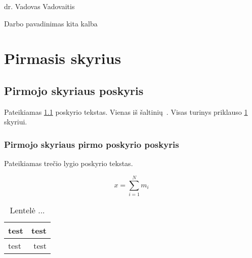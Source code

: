 \documentclass[a4paper,12pt,fleqn]{article}
\begin{document}
 {}{}{}{}%
 {dr. Vadovas Vadovaitis}

\tableofcontents



\bothabstracts{}%
{Darbo pavadinimas kita kalba} %
{}%






\newpage
\section{Pirmasis skyrius}
\label{sec:motivation}
\subsection{Pirmojo skyriaus poskyris}
\label{sec:example}
Pateikiamas \ref{sec:example} poskyrio tekstas. Vienas iš šaltinių~\cite{KTZ}. Visas turinys priklauso \ref{sec:motivation} skyriui.

\subsubsection{Pirmojo skyriaus pirmo poskyrio poskyris}
\label{sec:data}
Pateikiamas trečio lygio poskyrio tekstas.

\begin{equation}
x = \sum_{i=1}^N m_i
\end{equation}

\begin{table}[!ht]\centering
\caption{Lentelė ... }
\label{tabl:table}
\begin{tabular}{l|r|}
test&test\\ \hline
test&test\\
\end{tabular}
\end{table}
\end{document}
